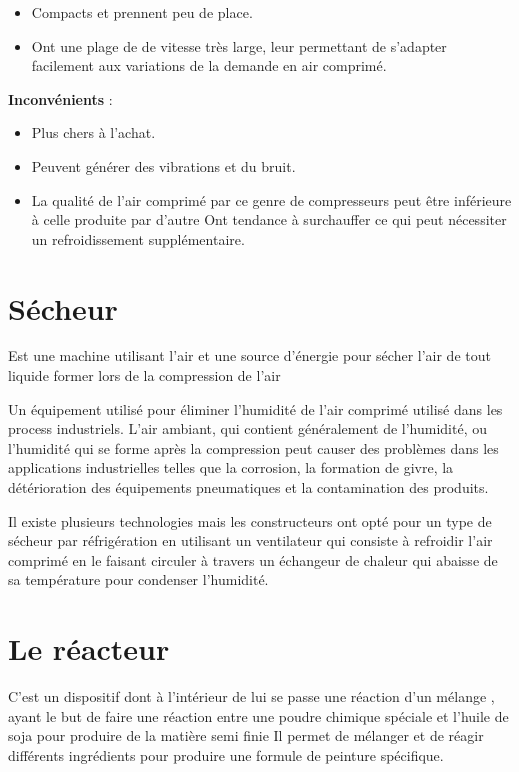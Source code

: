 \documentclass[20pt,a4paper]{report}
\begin{document}
\begin{large}
\begin{itemize}
	\item Compacts et prennent peu de place.
	
	\item Ont une plage de de vitesse très large, leur permettant de s’adapter facilement aux variations de la demande en air comprimé.
\end{itemize}

\textbf{Inconvénients} :

\begin{itemize}
	\item Plus chers à l’achat.
	
	\item Peuvent générer des vibrations et du bruit.
	
	\item La qualité de l’air comprimé par ce genre de compresseurs peut être inférieure à celle produite par d’autre
	Ont tendance à surchauffer ce qui peut nécessiter un refroidissement supplémentaire.
\end{itemize}

		\section{Sécheur }
Est une machine utilisant l’air et une source d’énergie pour sécher l’air de tout liquide former lors de la compression de l’air

Un équipement utilisé pour éliminer l’humidité de l’air comprimé utilisé dans les process industriels. L’air ambiant, qui contient généralement de l’humidité, ou l’humidité qui se forme après la compression peut causer des problèmes dans les applications industrielles telles que la corrosion, la formation de givre, la détérioration des équipements pneumatiques et la contamination des produits.

Il existe plusieurs technologies mais les constructeurs ont opté pour un type de sécheur par réfrigération en utilisant un ventilateur qui consiste à refroidir l’air comprimé en le faisant circuler à travers un échangeur de chaleur qui abaisse de sa température pour condenser l’humidité.

		\section{Le réacteur}
C’est un dispositif dont à l’intérieur de lui se passe une réaction d’un mélange , ayant le but de faire une réaction entre une poudre chimique spéciale et l’huile de soja pour produire de la matière semi finie
Il permet de mélanger et de réagir différents ingrédients pour produire une formule de peinture spécifique. 


\end{large}
\end{document}
